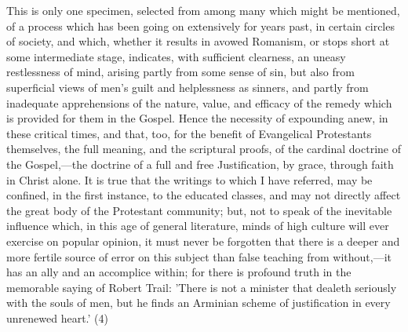 \documentclass[
]{book}
\begin{document}
This is only one specimen, selected from among many which might be mentioned, of a process which has been going on extensively for years past, in certain circles of society, and which, whether it results in avowed Romanism, or stops short at some intermediate stage, indicates, with sufficient clearness, an uneasy restlessness of mind, arising partly from some sense of sin, but also from superficial views of men's guilt and helplessness as sinners, and partly from inadequate apprehensions of the nature, value, and efficacy of the remedy which is provided for them in the Gospel. Hence the necessity of expounding anew, in these critical times, and that, too, for the benefit of Evangelical Protestants themselves, the full meaning, and the scriptural proofs, of the cardinal doctrine of the Gospel,---the doctrine of a full and free Justification, by grace, through faith in Christ alone. It is true that the writings to which I have referred, may be confined, in the first instance, to the educated classes, and may not directly affect the great body of the Protestant community; but, not to speak of the inevitable influence which, in this age of general literature, minds of high culture will ever exercise on popular opinion, it must never be forgotten that there is a deeper and more fertile source of error on this subject than false teaching from without,---it has an ally and an accomplice within; for there is profound truth in the memorable saying of Robert Trail: 'There is not a minister that dealeth seriously with the souls of men, but he finds an Arminian scheme of justification in every unrenewed heart.' (4)
\end{document}
